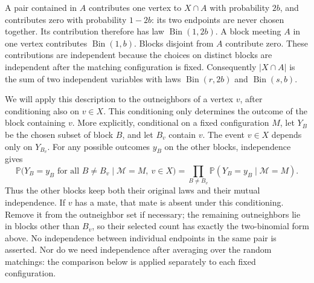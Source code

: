 \documentclass[12pt]{article}
\DeclareMathOperator{\Bin}{Bin}
\newcommand{\Pp}{\mathbb P}
\newcommand{\abs}[1]{|#1|}
\begin{document}
A pair contained in \(A\) contributes one vertex to \(X\cap A\) with probability \(2b\), and contributes zero with probability \(1-2b\): its two endpoints are never chosen together. Its contribution therefore has law \(\Bin(1,2b)\). A block meeting \(A\) in one vertex contributes \(\Bin(1,b)\). Blocks disjoint from \(A\) contribute zero. These contributions are independent because the choices on distinct blocks are independent after the matching configuration is fixed. Consequently \(\abs{X\cap A}\) is the sum of two independent variables with laws \(\Bin(r,2b)\) and \(\Bin(s,b)\).

We will apply this description to the outneighbors of a vertex \(v\), after conditioning also on \(v\in X\). This conditioning only determines the outcome of the block containing \(v\). More explicitly, conditional on a fixed configuration \(M\), let \(Y_B\) be the chosen subset of block \(B\), and let \(B_v\) contain \(v\). The event \(v\in X\) depends only on \(Y_{B_v}\). For any possible outcomes \(y_B\) on the other blocks, independence gives
\[
\Pp\bigl(Y_B=y_B\text{ for all }B\ne B_v\mid\mathcal M=M,\ v\in X\bigr)
=\prod_{B\ne B_v}\Pp(Y_B=y_B\mid\mathcal M=M).
\]
Thus the other blocks keep both their original laws and their mutual independence. If \(v\) has a mate, that mate is absent under this conditioning. Remove it from the outneighbor set if necessary; the remaining outneighbors lie in blocks other than \(B_v\), so their selected count has exactly the two-binomial form above. No independence between individual endpoints in the same pair is asserted. Nor do we need independence after averaging over the random matchings: the comparison below is applied separately to each fixed configuration.
\end{document}
